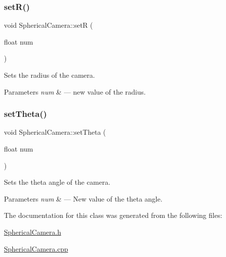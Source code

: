 \subsubsection{\texorpdfstring{set\+R()}{setR()}}
{\footnotesize\ttfamily void Spherical\+Camera\+::setR (\begin{DoxyParamCaption}\item[{float}]{num }\end{DoxyParamCaption})}



Sets the radius of the camera. 


\begin{DoxyParams}{Parameters}
{\em num} & --- new value of the radius. \\
\hline
\end{DoxyParams}
\mbox{\label{class_spherical_camera_a5ba561ae714920e6d67da11397f21a3a}} 
\subsubsection{\texorpdfstring{set\+Theta()}{setTheta()}}
{\footnotesize\ttfamily void Spherical\+Camera\+::set\+Theta (\begin{DoxyParamCaption}\item[{float}]{num }\end{DoxyParamCaption})}



Sets the theta angle of the camera. 


\begin{DoxyParams}{Parameters}
{\em num} & --- New value of the theta angle. \\
\hline
\end{DoxyParams}


The documentation for this class was generated from the following files\+:\begin{DoxyCompactItemize}
\item 
\hyperlink{_spherical_camera_8h}{Spherical\+Camera.\+h}\item 
\hyperlink{_spherical_camera_8cpp}{Spherical\+Camera.\+cpp}\end{DoxyCompactItemize}
